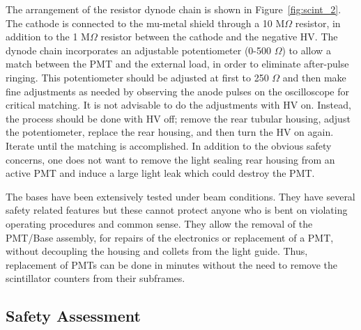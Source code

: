 {  The arrangement of the resistor dynode chain is shown in 
  Figure~\ref{fig:scint_2}. The 
  cathode is connected to the mu-metal shield through a 10 M$\Omega$ resistor, in
  addition to the 1 M$\Omega$ resistor between the cathode and the negative HV. The
  dynode chain incorporates an adjustable potentiometer (0-500 $\Omega$) to allow a
  match between the PMT and the external load, in order to eliminate after-pulse
  ringing.  This potentiometer should be adjusted at first to 250 $\Omega$ and then
  make fine adjustments as needed by observing the anode pulses on the
  oscilloscope for critical matching. It is not advisable to do the adjustments
  with HV on. Instead, the process should be done with HV off; remove the rear
  tubular housing, adjust the potentiometer, replace the rear housing, and then
  turn the HV on again. Iterate until the matching is accomplished. In addition to the
  obvious safety concerns, one does not want to remove the light sealing rear
  housing from an active PMT and induce a large light leak which could destroy
  the PMT. 
  
  The bases have been extensively tested under beam conditions. 
  They have several safety related features but these cannot protect anyone who 
  is bent on violating operating procedures and common sense. They allow the 
  removal of the PMT/Base assembly, for repairs of the electronics or replacement 
  of a PMT, without decoupling the housing and collets from the light guide. 
  Thus, replacement of PMTs can be done in minutes without the need to remove the 
  scintillator counters from their subframes.
}

\subsection{Safety Assessment}
  
